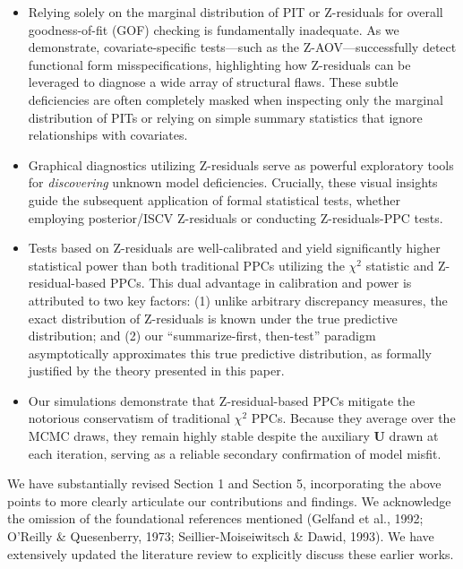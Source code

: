 \documentclass[11pt]{article}
\begin{document}
\begin{itemize}
    \item Relying solely on the marginal distribution of PIT or Z-residuals for overall goodness-of-fit (GOF) checking is fundamentally inadequate. As we demonstrate, covariate-specific tests---such as the Z-AOV---successfully detect functional form misspecifications, highlighting how Z-residuals can be leveraged to diagnose a wide array of structural flaws. These subtle deficiencies are often completely masked when inspecting only the marginal distribution of PITs or relying on simple summary statistics that ignore relationships with covariates.
    
    \item Graphical diagnostics utilizing Z-residuals serve as powerful exploratory tools for \textit{discovering} unknown model deficiencies. Crucially, these visual insights guide the subsequent application of formal statistical tests, whether employing posterior/ISCV Z-residuals or conducting Z-residuals-PPC tests.
    
    \item Tests based on Z-residuals are well-calibrated and yield significantly higher statistical power than both traditional PPCs utilizing the $\chi^2$ statistic and Z-residual-based PPCs. This dual advantage in calibration and power is attributed to two key factors: (1) unlike arbitrary discrepancy measures, the exact distribution of Z-residuals is known under the true predictive distribution; and (2) our ``summarize-first, then-test'' paradigm asymptotically approximates this true predictive distribution, as formally justified by the theory presented in this paper.
    
    \item Our simulations demonstrate that  Z-residual-based PPCs mitigate the notorious conservatism of traditional $\chi^2$ PPCs. Because they average over the MCMC draws, they remain highly stable despite the auxiliary $\bm{U}$ drawn at each iteration, serving as a reliable secondary confirmation of model misfit.
\end{itemize}

 We have substantially revised Section 1 and Section 5, incorporating the above points to more clearly articulate our contributions and findings. We acknowledge the omission of the foundational references mentioned (Gelfand et al., 1992; O'Reilly \& Quesenberry, 1973; Seillier-Moiseiwitsch \& Dawid, 1993). We have extensively updated the literature review to explicitly discuss these earlier works. 
\end{document}
